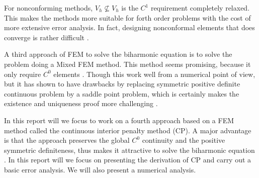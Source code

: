 For nonconforming methods, $V_{h} \not \subseteq  V_{h}$ is the $C^{1}$ requirement completely relaxed. This makes the methods more suitable for forth order problems with the cost of more extensive error analysis. In fact, designing nonconformal
elements that does converge is rather difficult \cite{shi02, nair21}.

A third approach of FEM to solve the biharmonic equation is to solve the problem doing a Mixed FEM method. This method seems promising, because it only require $C^{0}$ elements \cite{chen08, brezzi91}.
Though this work well from a numerical point of view, but it has shown to have drawbacks by replacing symmetric positive definite continuous problem
by a saddle point problem, which is certainly makes the existence and uniqueness proof more challenging \cite{brezzi74}.

In this report will we focus to work on a fourth approach based on a FEM method called the continuous interior penalty method (CP). A major advantage is that the approach preserves the global $C^{0}$ continuity and the positive symmetric definiteness, thus makes it attractive to solve the biharmonic equation \cite{brenner2012, brenner2012quadratic}. In this report will we focus on presenting the derivation of CP and carry out a basic error analysis. We will also present a numerical analysis.

